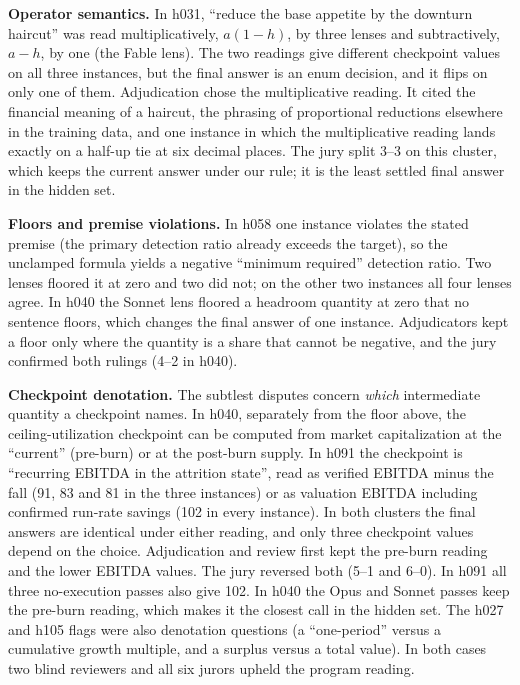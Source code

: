 \documentclass[conference]{IEEEtran}
\begin{document}
\textbf{Operator semantics.} In h031, ``reduce the base appetite by the downturn haircut'' was read multiplicatively,
$a(1-h)$, by three lenses and subtractively, $a-h$, by one (the Fable lens). The two readings give different
checkpoint values on all three instances, but the final answer is an enum decision, and it flips on only one of them.
Adjudication chose the multiplicative reading. It cited
the financial meaning of a haircut, the phrasing of proportional reductions elsewhere in the training data, and one
instance in which the multiplicative reading lands exactly on a half-up tie at six decimal places. The jury split
3--3 on this cluster, which keeps the current answer under our rule; it is the least settled final answer in the
hidden set.

\textbf{Floors and premise violations.} In h058 one instance violates the stated premise (the primary detection ratio
already exceeds the target), so the unclamped formula yields a negative ``minimum required'' detection ratio. Two
lenses floored it at zero and two did not; on the other two instances all four lenses agree. In h040 the Sonnet lens
floored a headroom quantity at zero that no sentence
floors, which changes the final answer of one instance. Adjudicators kept a floor only where the quantity is a share
that cannot be negative, and the jury confirmed both rulings (4--2 in h040).

\textbf{Checkpoint denotation.} The subtlest disputes concern \emph{which} intermediate quantity a checkpoint names.
In h040, separately from the floor above, the ceiling-utilization checkpoint can be computed from market
capitalization at the ``current'' (pre-burn) or at the post-burn supply. In h091 the checkpoint is ``recurring
EBITDA in the attrition state'', read as verified EBITDA minus the fall (91, 83 and 81 in the three instances) or as
valuation EBITDA including
confirmed run-rate savings (102 in every instance). In both clusters the final answers are identical under either
reading, and only three checkpoint values depend on the choice. Adjudication and review first kept the pre-burn
reading and the lower EBITDA values. The jury reversed both (5--1 and 6--0). In h091 all three no-execution passes also
give 102. In h040 the
Opus and Sonnet passes keep the pre-burn reading, which makes it the closest call in the hidden set. The h027 and h105 flags were also denotation questions (a ``one-period''
versus a cumulative growth multiple, and a surplus versus a total value). In both cases two blind reviewers and all
six jurors upheld the program reading.
\end{document}
